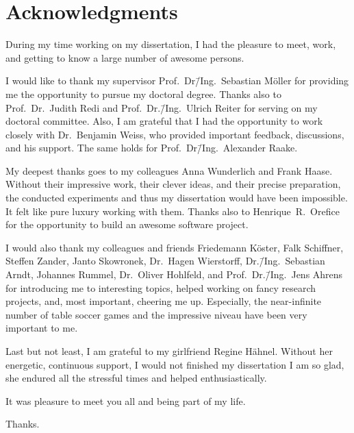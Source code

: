 
\bigskip

\begingroup
\let\clearpage\relax
\let\cleardoublepage\relax
\chapter*{Acknowledgments}
During my time working on my dissertation, I had the pleasure to meet, work, and getting to know a large number of awesome persons.

I would like to thank my supervisor Prof.~Dr\=/Ing.~Sebastian Möller for providing me the opportunity to pursue my doctoral degree.
Thanks also to Prof.~Dr.~Judith Redi and Prof.~Dr.\=/Ing.~Ulrich Reiter for serving on my doctoral committee.
Also, I am grateful that I had the opportunity to work closely with Dr.~Benjamin Weiss, who provided important feedback, discussions, and his support.
The same holds for Prof.~Dr\=/Ing.~Alexander Raake.

My deepest thanks goes to my colleagues Anna Wunderlich and Frank Haase.
Without their impressive work, their clever ideas, and their precise preparation, the conducted experiments and thus my dissertation would have been impossible.
It felt like pure luxury working with them.
Thanks also to Henrique~R.~Orefice for the opportunity to build an awesome software project.

I would also thank my colleagues and friends Friedemann Köster, Falk Schiffner, Steffen Zander, Janto Skowronek, Dr.~Hagen Wierstorff, Dr.\=/Ing.~Sebastian Arndt, Johannes Rummel, Dr.~Oliver Hohlfeld, and Prof.~Dr.\=/Ing.~Jens Ahrens for introducing me to interesting topics, helped working on fancy research projects, and, most important, cheering me up.
Especially, the near-infinite number of table soccer games and the impressive niveau have been very important to me.

Last but not least, I am grateful to my girlfriend Regine Hähnel.
Without her energetic, continuous support, I would not finished my dissertation
I am so glad, she endured all the stressful times and helped enthusiastically.

\bigskip
It was pleasure to meet you all and being part of my life.

\bigskip
Thanks.

\endgroup
